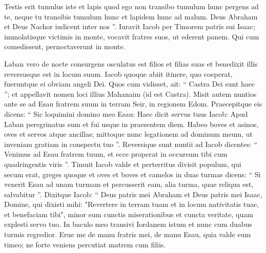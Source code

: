 \begin{biblechapter}
\begin{biblechapter}
\begin{biblechapter}
\begin{biblechapter}
\begin{biblechapter}
\begin{biblechapter}
\begin{biblechapter}
\begin{biblechapter}
\begin{biblechapter}
\begin{biblechapter}
\begin{biblechapter}
\begin{biblechapter}
\begin{biblechapter}
\begin{biblechapter}
\begin{biblechapter}
\begin{biblechapter}
\begin{biblechapter}
\begin{biblechapter}
\begin{biblechapter}
\begin{biblechapter}
\begin{biblechapter}
\begin{biblechapter}
\begin{biblechapter}
\begin{biblechapter}
\begin{biblechapter}
\begin{biblechapter}
\begin{biblechapter}
\begin{biblechapter}
\begin{biblechapter}
\begin{biblechapter}
\begin{biblechapter}
\verse Testis erit tumulus iste et lapis quod ego non transibo tumulum hunc pergens ad te, neque tu transibis tumulum hunc et lapidem hunc ad malum. 
\verse Deus Abraham et Deus Nachor iudicent inter nos ”.
 Iuravit Iacob per Timorem patris sui Isaac; 
\verse immolatisque victimis in monte, vocavit fratres suos, ut ederent panem. Qui cum comedissent, pernoctaverunt in monte.
 
\begin{biblechapter}
\verse Laban vero de nocte consurgens osculatus est filios et filias suas et benedixit illis reversusque est in locum suum.
 \verse Iacob quoque abiit itinere, quo coeperat, fueruntque ei obviam angeli Dei. 
 \verse Quos cum vidisset, ait: “ Castra Dei sunt haec ”; et appellavit nomen loci illius Mahanaim (id est Castra).
 \verse Misit autem nuntios ante se ad Esau fratrem suum in terram Seir, in regionem Edom. 
\verse Praecepitque eis dicens: “ Sic loquimini domino meo Esau: Haec dicit servus tuus Iacob: Apud Laban peregrinatus sum et fui usque in praesentem diem. 
\verse Habeo boves et asinos, oves et servos atque ancillas; mittoque nunc legationem ad dominum meum, ut inveniam gratiam in conspectu tuo ”.
 \verse Reversique sunt nuntii ad Iacob dicentes: “ Venimus ad Esau fratrem tuum, et ecce properat in occursum tibi cum quadringentis viris ”. 
\verse Timuit Iacob valde et perterritus divisit populum, qui secum erat, greges quoque et oves et boves et camelos in duas turmas 
\verse dicens: “ Si venerit Esau ad unam turmam et percusserit eam, alia turma, quae reliqua est, salvabitur ”.
 \verse Dixitque Iacob: “ Deus patris mei Abraham et Deus patris mei Isaac, Domine, qui dixisti mihi: "Revertere in terram tuam et in locum nativitatis tuae, et benefaciam tibi", 
\verse minor sum cunctis miserationibus et cuncta veritate, quam explesti servo tuo. In baculo meo transivi Iordanem istum et nunc cum duabus turmis regredior. 
\verse Erue me de manu fratris mei, de manu Esau, quia valde eum timeo; ne forte veniens percutiat matrem cum filiis. 

\end{biblechapter}
\end{biblechapter}
\end{biblechapter}
\end{biblechapter}
\end{biblechapter}
\end{biblechapter}
\end{biblechapter}
\end{biblechapter}
\end{biblechapter}
\end{biblechapter}
\end{biblechapter}
\end{biblechapter}
\end{biblechapter}
\end{biblechapter}
\end{biblechapter}
\end{biblechapter}
\end{biblechapter}
\end{biblechapter}
\end{biblechapter}
\end{biblechapter}
\end{biblechapter}
\end{biblechapter}
\end{biblechapter}
\end{biblechapter}
\end{biblechapter}
\end{biblechapter}
\end{biblechapter}
\end{biblechapter}
\end{biblechapter}
\end{biblechapter}
\end{biblechapter}
\end{biblechapter}
